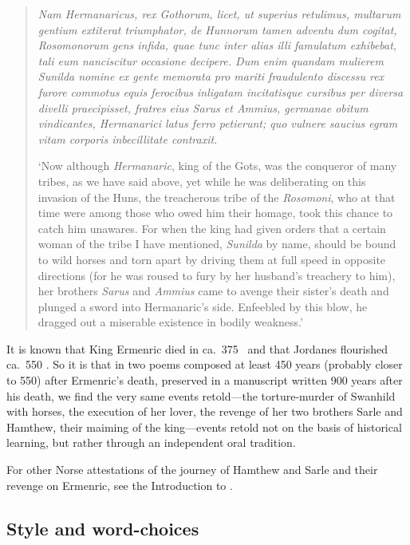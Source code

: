 \begin{quote}\begin{small}
  \emph{Nam Hermanaricus, rex Gothorum, licet, ut superius retulimus, multarum gentium extiterat triumphator, de Hunnorum tamen adventu dum cogitat, Rosomonorum gens infida, quae tunc inter alias illi famulatum exhibebat, tali eum nanciscitur occasione decipere. Dum enim quandam mulierem Sunilda nomine ex gente memorata pro mariti fraudulento discessu rex furore commotus equis ferocibus inligatam incitatisque cursibus per diversa divelli praecipisset, fratres eius Sarus et Ammius, germanae obitum vindicantes, Hermanarici latus ferro petierunt; quo vulnere saucius egram vitam corporis inbecillitate contraxit.}

  ‘Now although \emph{Hermanaric}, king of the Gots, was the conqueror of many tribes, as we have said above, yet while he was deliberating on this invasion of the Huns, the treacherous tribe of the \emph{Rosomoni}, who at that time were among those who owed him their homage, took this chance to catch him unawares. For when the king had given orders that a certain woman of the tribe I have mentioned, \emph{Sunilda} by name, should be bound to wild horses and torn apart by driving them at full speed in opposite directions (for he was roused to fury by her husband’s treachery to him), her brothers \emph{Sarus} and \emph{Ammius} came to avenge their sister’s death and plunged a sword into Hermanaric’s side. Enfeebled by this blow, he dragged out a miserable existence in bodily weakness.’ \parencite[87]{Jordanes1915}
\end{small}\end{quote}

It is known that King Ermenric died in ca.~375 \ce\ and that Jordanes flourished ca.~550 \ce.  So it is that in two poems composed at least 450 years (probably closer to 550) after Ermenric’s death, preserved in a manuscript written 900 years after his death, we find the very same events retold---the torture-murder of Swanhild with horses, the execution of her lover, the revenge of her two brothers Sarle and Hamthew, their maiming of the king---events retold not on the basis of historical learning, but rather through an independent oral tradition.

For other Norse attestations of the journey of Hamthew and Sarle and their revenge on Ermenric, see the Introduction to .

\subsection{Style and word-choices}

